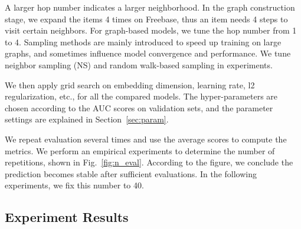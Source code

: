 \documentclass[sigconf]{acmart}
\begin{document}
A larger hop number indicates a larger neighborhood.
In the graph construction stage, we expand the items 4 times on Freebase, thus an item needs 4 steps to visit certain neighbors.
For graph-based models, we tune the hop number from 1 to 4.
Sampling methods are mainly introduced to speed up training on large graphs, and sometimes influence model convergence and performance.
We tune neighbor sampling (NS) and random walk-based sampling in experiments. 

We then apply grid search on embedding dimension, learning rate, l2 regularization, etc.,  for all the compared models.
The hyper-parameters are chosen according to the AUC scores on validation sets, and the parameter settings are explained in Section~\ref{sec:param}.

We repeat evaluation several times and use the average scores to compute the metrics. We perform an empirical experiments to determine the number of repetitions, shown in Fig.~\ref{fig:n_eval}. According to the figure, we conclude the prediction becomes stable after sufficient evaluations.
In the following experiments, we fix this number to 40.

\subsection{Experiment Results}
\end{document}
